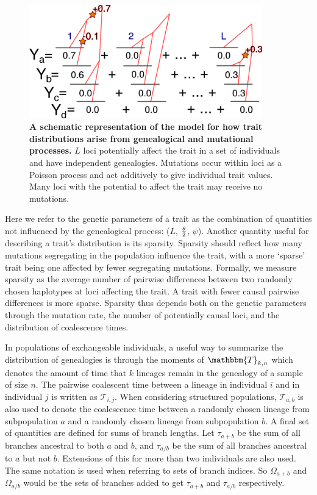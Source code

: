 \begin{figure}
  \centering
  \includegraphics[width=0.9\textwidth]{./figures/schema.png}

  \caption{\textbf{A schematic representation of the model for how trait
  distributions arise from genealogical and mutational processes.} $L$ loci
  potentially affect the trait in a set of individuals and have independent
  genealogies. Mutations occur within loci as a Poisson process and act
  additively to give individual trait values. Many loci with the potential to
  affect the trait may receive no mutations.}

  \label{fig:schema}
\end{figure}

Here we refer to the genetic parameters of a trait as the combination of
quantities not influenced by the genealogical process: ($L$, $\frac{\theta}{2}$, $\psi$).
Another quantity useful for describing a trait's distribution is its sparsity.
Sparsity should reflect how many mutations segregating in the population
influence the trait, with a more `sparse' trait being one affected by fewer
segregating mutations. Formally, we measure sparsity as the average number of
pairwise differences between two randomly chosen haplotypes at loci affecting
the trait. A trait with fewer causal pairwise differences is more sparse.
Sparsity thus depends both on the genetic parameters through the mutation rate,
the number of potentially causal loci, and the distribution of coalescence
times.

In populations of exchangeable individuals, a useful way to summarize the
distribution of genealogies is through the moments of $\mathbbm{T}_{k,n}$ which
denotes the amount of time that $k$ lineages remain in the genealogy of a sample
of size $n$. The pairwise coalescent time between a lineage in individual $i$
and in individual $j$ is written as $\mathcal{T}_{i,j}$. When considering
structured populations, $\mathcal{T}_{a,b}$ is also used to denote the
coalescence time between a randomly chosen lineage from subpopulation $a$ and a
randomly chosen lineage from subpopulation $b$. A final set of quantities are
defined for sums of branch lengths. Let $\tau_{a+b}$ be the sum of all branches
ancestral to both $a$ and $b$, and $\tau_{a/b}$ be the sum of all branches
ancestral to $a$ but not $b$. Extensions of this for more than two individuals
are also used. The same notation is used when referring to sets of branch
indices. So $\Omega_{a+b}$ and $\Omega_{a/b}$ would be the sets of branches
added to get $\tau_{a+b}$ and $\tau_{a/b}$ respectively.

